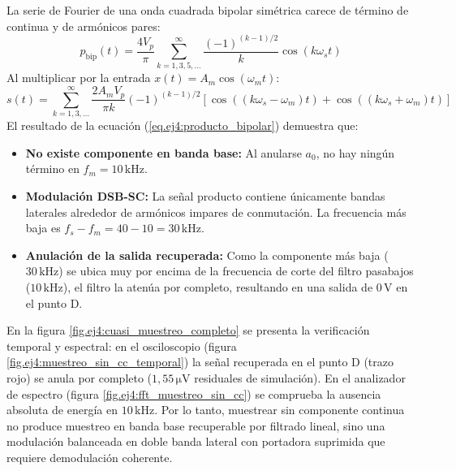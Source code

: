 La serie de Fourier de una onda cuadrada bipolar simétrica carece de término de continua y de armónicos pares:
\begin{equation}
    p_{\mathrm{bip}}(t) = \frac{4 V_p}{\pi} \sum_{k=1, 3, 5, \dots}^\infty \frac{(-1)^{(k-1)/2}}{k} \cos(k \omega_s t)
    \label{eq.ej4:fourier_bipolar}
\end{equation}
Al multiplicar por la entrada $x(t) = A_m \cos(\omega_m t)$:
\begin{equation}
    s(t) = \sum_{k=1, 3, \dots}^\infty \frac{2 A_m V_p}{\pi k} (-1)^{(k-1)/2} \left[ \cos\left((k \omega_s - \omega_m)t\right) + \cos\left((k \omega_s + \omega_m)t\right) \right]
    \label{eq.ej4:producto_bipolar}
\end{equation}
El resultado de la ecuación (\ref{eq.ej4:producto_bipolar}) demuestra que:
\begin{itemize}
    \item \textbf{No existe componente en banda base:} Al anularse $a_0$, no hay ningún término en $f_m = 10\,\unit{\kilo\hertz}$.
    \item \textbf{Modulación DSB-SC:} La señal producto contiene únicamente bandas laterales alrededor
          de armónicos impares de conmutación. La frecuencia más baja es $f_s - f_m = 40 - 10 = 30\,\unit{\kilo\hertz}$.
    \item \textbf{Anulación de la salida recuperada:} Como la componente más baja ($30\,\unit{\kilo\hertz}$) se ubica muy
          por encima de la frecuencia de corte del filtro pasabajos ($10\,\unit{\kilo\hertz}$), el filtro la atenúa por
          completo, resultando en una salida de $0\,\unit{\volt}$ en el punto D.
\end{itemize}

En la figura \ref{fig.ej4:cuasi_muestreo_completo} se presenta la verificación temporal y espectral: en el
osciloscopio (figura \ref{fig.ej4:muestreo_sin_cc_temporal}) la señal recuperada en el punto D (trazo rojo) se anula
por completo ($1{,}55\,\unit{\micro\volt}$ residuales de simulación). En el analizador de espectro (figura
\ref{fig.ej4:fft_muestreo_sin_cc}) se comprueba la ausencia absoluta de energía en $10\,\unit{\kilo\hertz}$. Por lo
tanto, muestrear sin componente continua no produce muestreo en banda base recuperable por filtrado lineal, sino una
modulación balanceada en doble banda lateral con portadora suprimida que requiere demodulación coherente.

